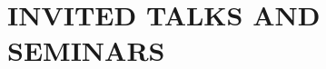 \documentclass[paper=letter,fontsize=11pt]{scrartcl} %
\newcommand{\NewPart}[2]{\section*{\uppercase{#1} #2}}
\begin{document}
%
%

\NewPart{Invited Talks and Seminars}{}
\end{document}
